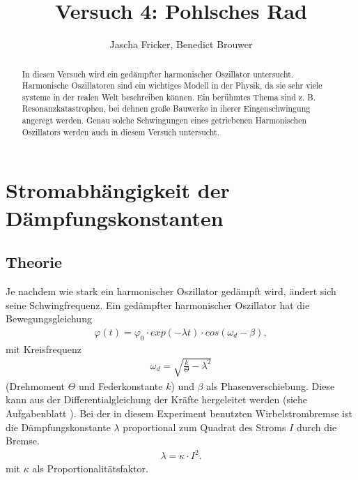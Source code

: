 \documentclass[11pt, a4paper]{article}
\title{Versuch 4: Pohlsches Rad}
\author{Jascha Fricker, Benedict Brouwer}
\begin{document}
    \maketitle

    

    \begin{abstract}
        In diesen Versuch wird ein gedämpfter harmonischer Oszillator untersucht. Harmonische Oszillatoren
        sind ein wichtiges Modell in der Physik, da sie sehr viele systeme in der realen Welt beschreiben können.
        Ein berühmtes Thema sind z. B. Resonanzkatastrophen, bei dehnen große Bauwerke in iherer Eingenschwingung
        angeregt werden. Genau solche Schwingungen eines getriebenen Harmonischen Oszillators werden auch in diesem
        Versuch untersucht.
    \end{abstract}

    \tableofcontents

    \newpage

    \section{Stromabhängigkeit der Dämpfungskonstanten}
    \subsection{Theorie}
    Je nachdem wie stark ein harmonischer Oszillator gedämpft wird, ändert sich seine Schwingfrequenz.
    Ein gedämpfter harmonischer Oszillator hat die Bewegungsgleichung
    \begin{align}
        \varphi(t) = \varphi_0 \cdot exp(-\lambda t) \cdot cos(\omega_d - \beta), \label{theo5}
    \end{align}
    mit Kreisfrequenz 
    \begin{align} \label{otheo}
        \omega_d = \sqrt{\frac{k}{\Theta} - \lambda^2}
    \end{align} 
    (Drehmoment $\Theta$ und Federkonstante $k$)
    und $\beta$ als Phasenverschiebung. Diese kann aus der Differentialgleichung der Kräfte 
    hergeleitet werden (siehe Aufgabenblatt \cite[(5)]{POR}).
    Bei der in diesem Experiment benutzten Wirbelstrombremse ist die
    Dämpfungskonstante $\lambda$ proportional zum Quadrat des Stroms $I$ durch die Bremse.
    \begin{align} \label{dtheo}
        \lambda = \kappa \cdot I^2.
    \end{align}
    mit $\kappa$ als Proportionalitätsfaktor.
\end{document}
